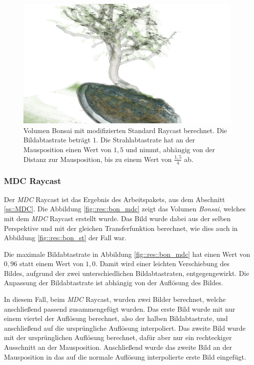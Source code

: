 \begin{landscape}
	\begin{figure}
		\centering
		\includegraphics[width=\textheight]{../../Neue_Messungen/Bonsai/st_ors.png}
		\caption{Volumen Bonsai mit modifizierten Standard Raycast berechnet. Die Bildabtastrate beträgt $1$. Die Strahlabtastrate hat an der Mausposition einen Wert von $1,5$ und nimmt, abhängig von der Distanz zur Mausposition, bis zu einem Wert von $\frac{1,5}{4}$ ab.}
		\label{fig::res::bon_st_ors}
	\end{figure}
\end{landscape}

\subsubsection{MDC Raycast}\label{ss::res::mdc}
Der \emph{MDC} Raycast ist das Ergebnis des Arbeitspakets, aus dem Abschnitt \ref{ss::MDC}.
Die Abbildung \ref{fig::res::bon_mdc} zeigt das Volumen \emph{Bonsai}, welches mit dem \emph{MDC} Raycast erstellt wurde.
Das Bild wurde dabei aus der selben Perspektive und mit der gleichen Transferfunktion berechnet, wie dies auch in Abbildung \ref{fig::res::bon_st} der Fall war.

Die maximale Bildabtastrate in Abbildung \ref{fig::res::bon_mdc} hat einen Wert von $0,96$ statt einem Wert von $1,0$.
Damit wird einer leichten Verschiebung des Bildes, aufgrund der zwei unterschiedlichen Bildabtastraten, entgegengewirkt.
Die Anpassung der Bildabtastrate ist abhängig von der Auflösung des Bildes.

In diesem Fall, beim \emph{MDC} Raycast, wurden zwei Bilder berechnet, welche anschließend passend zusammengefügt wurden.
Das erste Bild wurde mit nur einem viertel der Auflösung berechnet, also der halben Bildabtastrate, und anschließend auf die ursprüngliche Auflösung interpoliert.
Das zweite Bild wurde mit der ursprünglichen Auflösung berechnet, dafür aber nur ein rechteckiger Ausschnitt an der Mausposition.
Anschließend wurde das zweite Bild an der Mausposition in das auf die normale Auflösung interpolierte erste Bild eingefügt.

